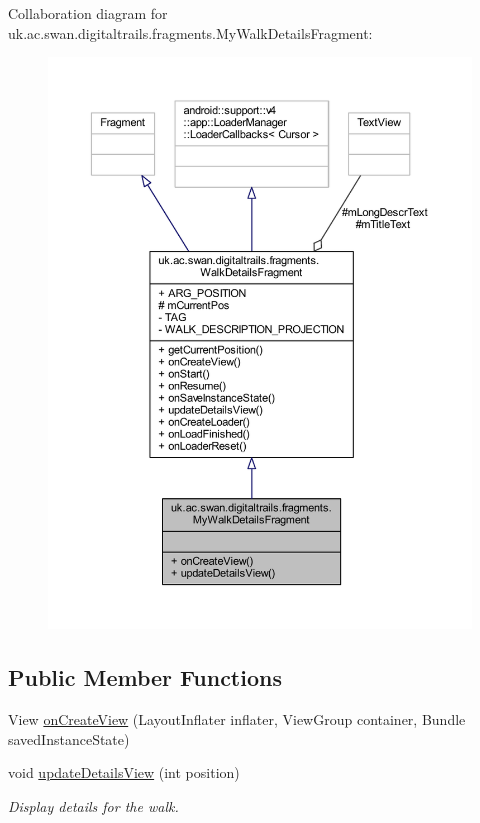 Collaboration diagram for uk.\+ac.\+swan.\+digitaltrails.\+fragments.\+My\+Walk\+Details\+Fragment\+:
\nopagebreak
\begin{figure}[H]
\begin{center}
\leavevmode
\includegraphics[width=350pt]{classuk_1_1ac_1_1swan_1_1digitaltrails_1_1fragments_1_1_my_walk_details_fragment__coll__graph}
\end{center}
\end{figure}
\subsection*{Public Member Functions}
\begin{DoxyCompactItemize}
\item 
View \hyperlink{classuk_1_1ac_1_1swan_1_1digitaltrails_1_1fragments_1_1_my_walk_details_fragment_a2de2e058b1496f71a8595baf8aa62521}{on\+Create\+View} (Layout\+Inflater inflater, View\+Group container, Bundle saved\+Instance\+State)
\item 
void \hyperlink{classuk_1_1ac_1_1swan_1_1digitaltrails_1_1fragments_1_1_my_walk_details_fragment_aabc0f13013a905c581819a0052abdc1b}{update\+Details\+View} (int position)
\begin{DoxyCompactList}\small\item\em Display details for the walk. \end{DoxyCompactList}\end{DoxyCompactItemize}
